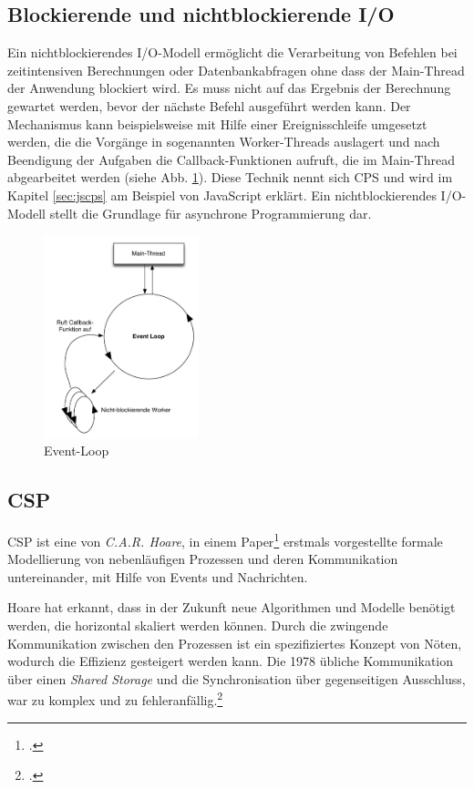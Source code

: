 \documentclass[12pt,a4paper,parskip=half,listof=totoc]{scrreprt}
\begin{document}
\subsection{Blockierende und nichtblockierende \acs{I/O}}
\label{sec:nonblocking}Ein nichtblockierendes I/O-Modell ermöglicht die Verarbeitung von Befehlen bei zeitintensiven Berechnungen oder Datenbankabfragen ohne dass der Main-Thread der Anwendung blockiert wird. Es muss nicht auf das Ergebnis der Berechnung gewartet werden, bevor der nächste Befehl ausgeführt werden kann. Der Mechanismus kann beispielsweise mit Hilfe einer Ereignisschleife umgesetzt werden, die die Vorgänge in sogenannten Worker-Threads auslagert und nach Beendigung der Aufgaben die Callback-Funktionen aufruft, die im Main-Thread abgearbeitet werden (siehe Abb. \ref{fig:nonblocking}). Diese Technik nennt sich \acf{CPS} und wird im Kapitel \ref{sec:jscps} am Beispiel von JavaScript erklärt. Ein nichtblockierendes I/O-Modell stellt die Grundlage für asynchrone Programmierung dar.
\begin{figure}[H]
\centering
\includegraphics[width=0.4\textwidth]{images/nonblocking.png}
\caption[Event-Loop]{Event-Loop}
\label{fig:nonblocking}
\end{figure}

\subsection{\acl{CSP}}
\acf{CSP} ist eine von \textit{C.A.R. Hoare}, in einem Paper\footcite{CSP} erstmals vorgestellte formale Modellierung von nebenläufigen Prozessen und deren Kommunikation untereinander, mit Hilfe von Events und Nachrichten.

Hoare hat erkannt, dass in der Zukunft neue Algorithmen und Modelle benötigt werden, die horizontal skaliert werden können. Durch die zwingende Kommunikation zwischen den Prozessen ist ein spezifiziertes Konzept von Nöten, wodurch die Effizienz gesteigert werden kann. Die 1978 übliche Kommunikation über einen \textit{Shared Storage} und die Synchronisation über gegenseitigen Ausschluss, war zu komplex und zu fehleranfällig.\footcite[Introduction]{CSP}
\end{document}
